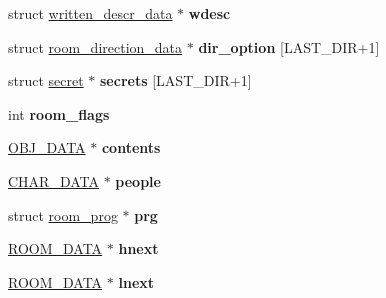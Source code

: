 \begin{DoxyCompactItemize}
\item 
\hypertarget{structroom__data_aa9dfc209119e69c508c5b6d77b1b106b}{struct \hyperlink{structwritten__descr__data}{written\-\_\-descr\-\_\-data} $\ast$ {\bfseries wdesc}}\label{structroom__data_aa9dfc209119e69c508c5b6d77b1b106b}

\item 
\hypertarget{structroom__data_ad7c6124bd14b4bb083c6ae973b21f31a}{struct \hyperlink{structroom__direction__data}{room\-\_\-direction\-\_\-data} $\ast$ {\bfseries dir\-\_\-option} \mbox{[}L\-A\-S\-T\-\_\-\-D\-I\-R+1\mbox{]}}\label{structroom__data_ad7c6124bd14b4bb083c6ae973b21f31a}

\item 
\hypertarget{structroom__data_a510a214502c552df4cd150fb29cd7494}{struct \hyperlink{structsecret}{secret} $\ast$ {\bfseries secrets} \mbox{[}L\-A\-S\-T\-\_\-\-D\-I\-R+1\mbox{]}}\label{structroom__data_a510a214502c552df4cd150fb29cd7494}

\item 
\hypertarget{structroom__data_a84dbca4dc31fa5c684a622ae44729024}{int {\bfseries room\-\_\-flags}}\label{structroom__data_a84dbca4dc31fa5c684a622ae44729024}

\item 
\hypertarget{structroom__data_a21ae8b8d9887eccbd976893a6fe78a02}{\hyperlink{structobj__data}{O\-B\-J\-\_\-\-D\-A\-T\-A} $\ast$ {\bfseries contents}}\label{structroom__data_a21ae8b8d9887eccbd976893a6fe78a02}

\item 
\hypertarget{structroom__data_ab90c1c312b2fb520ba8ee1d12167d044}{\hyperlink{structchar__data}{C\-H\-A\-R\-\_\-\-D\-A\-T\-A} $\ast$ {\bfseries people}}\label{structroom__data_ab90c1c312b2fb520ba8ee1d12167d044}

\item 
\hypertarget{structroom__data_ab6e1a39fd56bee5e9330d88f8b3cee02}{struct \hyperlink{structroom__prog}{room\-\_\-prog} $\ast$ {\bfseries prg}}\label{structroom__data_ab6e1a39fd56bee5e9330d88f8b3cee02}

\item 
\hypertarget{structroom__data_ae1d0742623d372dc510e1d1361059c17}{\hyperlink{structroom__data}{R\-O\-O\-M\-\_\-\-D\-A\-T\-A} $\ast$ {\bfseries hnext}}\label{structroom__data_ae1d0742623d372dc510e1d1361059c17}

\item 
\hypertarget{structroom__data_a09023636d7d6e20591e52aa7284499e8}{\hyperlink{structroom__data}{R\-O\-O\-M\-\_\-\-D\-A\-T\-A} $\ast$ {\bfseries lnext}}\label{structroom__data_a09023636d7d6e20591e52aa7284499e8}


\end{DoxyCompactItemize}
